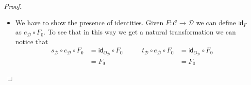 \documentclass[a4paper,UKenglish,cleveref,pdftex,thm-restate,numberwithinsect]{lipics-v2021}
\newcommand{\id}[1]{\mathsf{id}_{#1}}
\begin{document}
\begin{proof}
\begin{enumerate}
\begin{itemize}
				We can use the previous equality to get:
					\[\begin{split}
					p_{0, \mathcal{D}}\circ \theta'_{\mathcal{D}}\circ \psi_{\mathcal{D}} \circ \zeta &= q'_{1, \mathcal{D}}\circ \psi_{\mathcal{D}}\circ \zeta\\&=p_{0, \mathcal{D}}\circ q_{0, \mathcal{D}} \circ \zeta\\&= p_{0, \mathcal{D}}\circ \phi_{(\alpha, \beta)}\\&=\alpha\\&=p_{0, \mathcal{D}}\circ \phi_{(\alpha, \epsilon_2)}
				\end{split} \qquad 
				\begin{split}p_{1, \mathcal{D}}\circ \theta'_{\mathcal{D}} \circ \psi_{\mathcal{D}}\circ \zeta &=\gamma_{\mathcal{D}}\circ q'_{0, \mathcal{D}}\circ \psi_{\mathcal{D}}\circ \zeta\\&=\gamma_{\mathcal{D}}\circ \pi_{\mathcal{D}}\circ \zeta\\&=\gamma_{\mathcal{D}}\circ \phi_{(\beta, \delta)}\\&=\epsilon_2\\&=p_{1, \mathcal{D}}\circ \phi_{(\alpha, \epsilon_2)}
				\end{split}\]
				Therefore $ \theta'_{\mathcal{D}}\circ \psi_{\mathcal{D}}\circ \zeta = \phi_{(\alpha, \epsilon_2)}$.
				
			Summming up, all the internal subdiagram of the following one are commutative and so the whole diagram commutes too. But this is exactly the thesis.
			\[\xymatrix{O_{\mathcal{C}} \ar[r]_{\zeta} \ar[dr]_{\phi_{(\epsilon_1, \delta)}} \ar@/^.4cm/[rrr]^{\phi_{(\alpha, \epsilon_2)}}& Q_{\mathcal{D}}\ar[d]^{\theta_{\mathcal{D}}} \ar[r]_{\psi_{\mathcal{D}}}& Q_{\mathcal{D}}' \ar[r]_{\theta_{\mathcal{D}}'} & P_{\mathcal{D}} \ar[d]^{\gamma_{\mathcal{D}}}\\ & P_{\mathcal{D}} \ar[rr]_{\gamma_{\mathcal{D}}}&& A_{\mathcal{D}}}\]
				\item We have to show the presence of identities. Given $F\colon \mathcal{C}\to \mathcal{D}$ we can define $\id{F}$ as $e_{\mathcal{D}}\circ F_0$.  To see that in this way we get a natural transformation we can notice that
				\[\begin{split}
					s_{\mathcal{D}}\circ e_{\mathcal{D}}\circ F_0&= \id{O_{\mathcal{D}}}\circ F_0\\&=F_0
				\end{split}\qquad \begin{split}
					t_{\mathcal{D}}\circ e_{\mathcal{D}}\circ F_0&= \id{O_{\mathcal{D}}}\circ F_0\\&=F_0
				\end{split}\]
				

\end{itemize}
\end{enumerate}
\end{proof}
\end{document}
